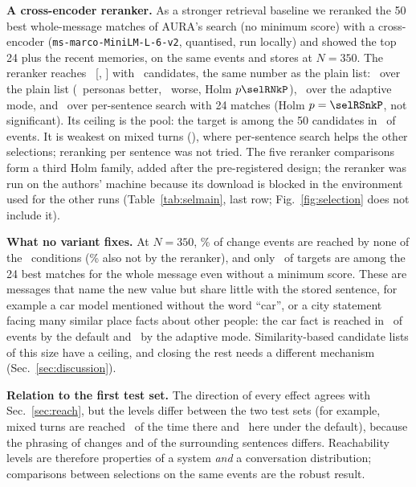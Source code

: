 \IfFileExists{IEEEtran.cls}{\documentclass[journal]{IEEEtran}\def\HAVEIEEE{1}}{\documentclass[10pt,twocolumn]{article}\usepackage[margin=0.7in,columnsep=0.25in]{geometry}}
\newcommand{\aura}{AURA}
\begin{document}
\textbf{A cross-encoder reranker.} As a stronger retrieval baseline we reranked the 50 best whole-message matches of \aura's search (no minimum score) with a cross-encoder (\texttt{ms-marco-MiniLM-L-6-v2}, quantised, run locally) and showed the top 24 plus the recent memories, on the same events and stores at $N=350$. The reranker reaches \selRerank\ [\selRerankLo, \selRerankHi] with \selRerankCand\ candidates, the same number as the plain list: \selRNk\ over the plain list (\selRNkPos\ personas better, \selRNkNeg\ worse, Holm $p\selRNkP$), \selRAda\ over the adaptive mode, and \selRSnk\ over per-sentence search with 24 matches (Holm $p=\selRSnkP$, not significant). Its ceiling is the pool: the target is among the 50 candidates in \selRerankPool\ of events. It is weakest on mixed turns (\selRerankMixed), where per-sentence search helps the other selections; reranking per sentence was not tried. The five reranker comparisons form a third Holm family, added after the pre-registered design; the reranker was run on the authors' machine because its download is blocked in the environment used for the other runs (Table~\ref{tab:selmain}, last row; Fig.~\ref{fig:selection} does not include it).

\textbf{What no variant fixes.} At $N=350$, \selMissedAllPct\% of change events are reached by none of the \selNConditions\ conditions (\selMissedAllRerankPct\% also not by the reranker), and only \selRtwentyfour\ of targets are among the 24 best matches for the whole message even without a minimum score. These are messages that name the new value but share little with the stored sentence, for example a car model mentioned without the word ``car'', or a city statement facing many similar place facts about other people: the car fact is reached in \selCarDefault\ of events by the default and \selCarAdaptive\ by the adaptive mode. Similarity-based candidate lists of this size have a ceiling, and closing the rest needs a different mechanism (Sec.~\ref{sec:discussion}).

\textbf{Relation to the first test set.} The direction of every effect agrees with Sec.~\ref{sec:reach}, but the levels differ between the two test sets (for example, mixed turns are reached \mixedDefault\ of the time there and \selDefaultMixed\ here under the default), because the phrasing of changes and of the surrounding sentences differs. Reachability levels are therefore properties of a system \emph{and} a conversation distribution; comparisons between selections on the same events are the robust result.
\end{document}
